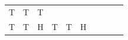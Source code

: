 {\begin{tabular}[t]{|l|l|l|l|l|l|l|l|l|l|}
        T &
    
    
        T &
    
    
        T%
     \tabularnewline\cline{1-1}\cline{2-2}\cline{3-3}\cline{4-4}\cline{5-5}\cline{6-6}\cline{7-7}\cline{8-8}\cline{9-9}\cline{10-10}
    
    
        T &
    
    
        T &
    
    
        H &
    
    
        T &
    
    
        T &
    
    
        H &
    

\end{tabular}}
